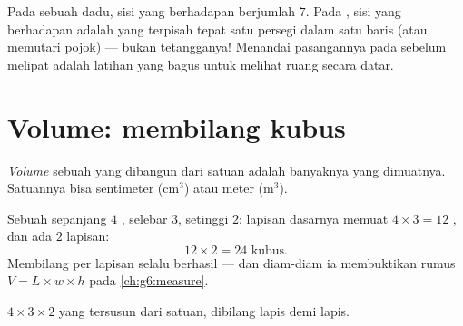 \begin{example}\label{ex:g5:solids:read}
Pada sebuah dadu, sisi yang berhadapan berjumlah $7$. Pada
, sisi yang berhadapan adalah yang terpisah tepat satu
persegi dalam satu baris (atau memutari pojok) --- bukan
tetangganya! Menandai pasangannya pada  sebelum melipat
adalah latihan yang bagus untuk melihat ruang secara datar.
\end{example}

\section{Volume: membilang kubus}

\begin{definition}\label{def:g5:solids:volume}
\emph{Volume} sebuah  yang dibangun dari
 satuan adalah banyaknya  yang dimuatnya. Satuannya bisa
 sentimeter (cm$^3$) atau  meter (m$^3$).
\end{definition}

\begin{example}\label{ex:g5:solids:layers}
Sebuah  sepanjang $4$ , selebar $3$, setinggi $2$: lapisan
dasarnya memuat $4 \times 3 = 12$ , dan ada $2$ lapisan:
\[
12 \times 2 = 24 \text{ kubus} .
\]
Membilang per lapisan selalu berhasil --- dan diam-diam ia
membuktikan rumus $V = L \times w \times h$ pada \cref{ch:g6:measure}.
\end{example}

\begin{omfigure}

{\small {} $4 \times 3 \times 2$ yang tersusun dari  satuan,
dibilang lapis demi lapis.}
\end{omfigure}

